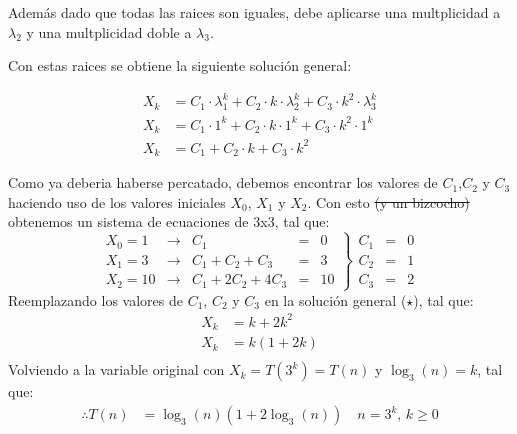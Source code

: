 \begin{solution}
Además dado que todas las raices son iguales, debe aplicarse una multplicidad a $\lambda_2$ y una multplicidad doble a $\lambda_3$.

Con estas raices se obtiene la siguiente solución general:

\begin{align*}
    X_k &= C_1 \cdot \lambda_1^k + C_2 \cdot k \cdot \lambda_2^k + C_3 \cdot k^2 \cdot \lambda_3^k\\
    X_k &= C_1 \cdot 1^k + C_2 \cdot k \cdot 1^k + C_3 \cdot k^2 \cdot 1^k\\
    X_k &= C_1 + C_2 \cdot k + C_3 \cdot k^2 \tag{$\star$}
\end{align*}

Como ya deberia haberse percatado, debemos encontrar los valores de $C_1$,$C_2$ y $C_3$ haciendo uso de los valores iniciales $X_0$, $X_1$ y $X_2$. Con esto \st{(y un bizcocho)} obtenemos un sistema de ecuaciones de 3x3, tal que:
$$
  \left.
    \begin{array}{rcrrcr}
      X_0=1 &\rightarrow& C_1 &=&0\\
      X_1=3 &\rightarrow& C_1 +C_2 + C_3 &=&3\\
      X_2=10 &\rightarrow& C_1 + 2C_2+4C_3 &=&10
      \end{array}
  \right\}
  \begin{array}{rcr}
       C_1&=& 0 \\
       C_2&=& 1\\
       C_3&=& 2
  \end{array}
$$
Reemplazando los valores de $C_1$, $C_2$ y $C_3$ en la solución general ($\star$), tal que:
\begin{align*}
    X_k &=k + 2k^2\\
    X_k &=k(1 + 2k)\\
\end{align*}
Volviendo a la variable original con $X_k= T\left(3^k\right)=T(n)$ y $\log_3(n)=k$, tal que:
\begin{align*}
    \therefore T(n)&=\log_3(n)(1+2\log_3(n))\quad n=3^k \text{, } k \ge 0
\end{align*}
\end{solution}